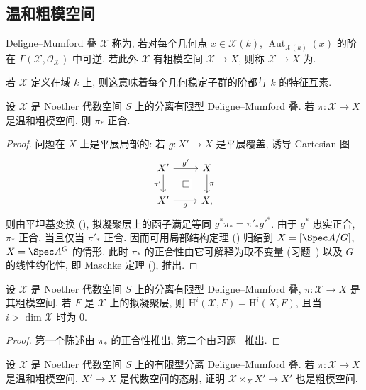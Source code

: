 \subsection{温和粗模空间}\label{src:5.4.4-subsection}
\begin{definition}\label{src:5.4.20}
Deligne--Mumford 叠 $\mathcal X$ 称为, 若对每个几何点 $x\in\mathcal X(k)$, $\operatorname{Aut}_{\mathcal X(k)}(x)$ 的阶在 $\Gamma(\mathcal X,\mathcal O_{\mathcal X})$ 中可逆. 若此外 $\mathcal X$ 有粗模空间 $\mathcal X\to X$, 则称 $\mathcal X\to X$ 为.
\end{definition}
\begin{remark}\label{src:5.4.21}
若 $\mathcal X$ 定义在域 $k$ 上, 则这意味着每个几何稳定子群的阶都与 $k$ 的特征互素.
\end{remark}
\begin{lemma}\label{src:5.4.22}
设 $\mathcal X$ 是 Noether 代数空间 $S$ 上的分离有限型 Deligne--Mumford 叠. 若 $\pi:\mathcal X\to X$ 是温和粗模空间, 则 $\pi_*$ 正合.
\end{lemma}
\begin{proof}
问题在 $X$ 上是平展局部的: 若 $g:X'\to X$ 是平展覆盖, 诱导 Cartesian 图
\[
\begin{tikzcd}
\mathcal X'\arrow[r,"{g'}"]\arrow[d,"{\pi'}"']&\mathcal X\arrow[d,"\pi"]\\
X'\arrow[r,"g"']\arrow[ur,phantom,"\square" description]&X,
\end{tikzcd}
\]
则由平坦基变换 (), 拟凝聚层上的函子满足等同 $g^*\pi_*=\pi'_*g'^*$. 由于 $g^*$ 忠实正合, $\pi_*$ 正合, 当且仅当 $\pi'_*$ 正合. 因而可用局部结构定理 () 归结到 $\mathcal X=[\Spec A/G]$, $X=\Spec A^G$ 的情形. 此时 $\pi_*$ 的正合性由它可解释为取不变量 (习题~) 以及 $G$ 的线性约化性, 即 Maschke 定理 (), 推出.
\end{proof}
\begin{corollary}\label{src:5.4.23}
设 $\mathcal X$ 是 Noether 代数空间 $S$ 上的分离有限型 Deligne--Mumford 叠, $\pi:\mathcal X\to X$ 是其粗模空间. 若 $F$ 是 $\mathcal X$ 上的拟凝聚层, 则 $\mathrm H^i(\mathcal X,F)=\mathrm H^i(X,F)$, 且当 $i>\dim\mathcal X$ 时为 $0$.
\end{corollary}
\begin{proof}
第一个陈述由 $\pi_*$ 的正合性推出, 第二个由习题~ 推出.
\end{proof}
\begin{exercise}[基变换]\label{src:5.4.24}
设 $\mathcal X$ 是 Noether 代数空间 $S$ 上的有限型分离 Deligne--Mumford 叠. 若 $\pi:\mathcal X\to X$ 是温和粗模空间, $X'\to X$ 是代数空间的态射, 证明 $\mathcal X\times_X X'\to X'$ 也是粗模空间.
\end{exercise}
